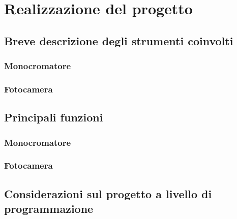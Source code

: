 \chapter{Realizzazione del progetto}
\thispagestyle{empty}

\section{Breve descrizione degli strumenti coinvolti}

\subsection{Monocromatore}
\subsection{Fotocamera}

\section{Principali funzioni}

\subsection{Monocromatore}
\subsection{Fotocamera}

\section{Considerazioni sul progetto a livello di programmazione}
